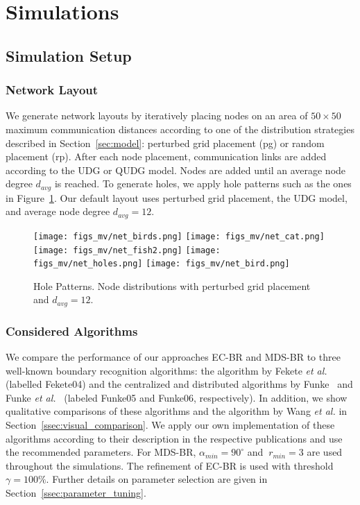 \documentclass{llncs}
\begin{document}
\section{Simulations}\label{sec:simulations}

\subsection{Simulation Setup}

\subsubsection{Network Layout}
We generate network layouts by iteratively placing nodes on an area of $50 \times 50$ maximum communication distances according to one of the distribution strategies described in Section~\ref{sec:model}: perturbed grid placement (pg) or random placement (rp).
After each node placement, communication links are added according to the UDG or QUDG model.
Nodes are added until an average node degree $d_{avg}$ is reached.
To generate holes, we apply hole patterns such as the ones in Figure~\ref{fig:nets}.
Our default layout uses perturbed grid placement, the UDG model, and average node degree $d_{avg}=12$.


\begin{figure}[b]
	\small
	\centering
	\texttt{[image: figs\_mv/net\_birds.png]}
	\texttt{[image: figs\_mv/net\_cat.png]}
	\texttt{[image: figs\_mv/net\_fish2.png]}
	\texttt{[image: figs\_mv/net\_holes.png]}
	\texttt{[image: figs\_mv/net\_bird.png]}
	\caption{Hole Patterns. Node distributions with perturbed grid placement and $d_{avg}=12$.\label{fig:nets}}
\end{figure}


\subsubsection{Considered Algorithms}
We compare the performance of our approaches EC-BR and MDS-BR to three well-known boundary recognition algorithms: the algorithm by Fekete \emph{et al.} \cite{fkpfb04} (labelled Fekete04) and the centralized and distributed algorithms by Funke~\cite{f05} and Funke \emph{et al.}~\cite{fk06} (labeled Funke05 and Funke06, respectively).
In addition, we show qualitative comparisons of these algorithms and the algorithm by Wang \emph{et al.} \cite{wgm06} in Section~\ref{ssec:visual_comparison}.
We apply our own implementation of these algorithms according to their description in the respective publications and use the recommended parameters.
For MDS-BR, $\alpha_{min} = 90^\circ$ and $\ r_{min} = 3$ are used throughout the simulations.
The refinement of EC-BR is used with threshold $\gamma=100\%$.
Further details on parameter selection are given in Section~\ref{ssec:parameter_tuning}.
\end{document}
